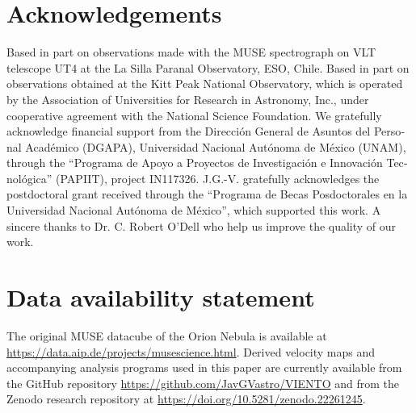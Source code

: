 \documentclass[fleqn,usenatbib, useAMS, a4paper]{mnras}
\begin{document}
\section*{Acknowledgements}
Based in part on observations made with the MUSE spectrograph
on VLT telescope UT4 at the La Silla Paranal Observatory, ESO, Chile.
Based in part on observations obtained at the Kitt Peak National Observatory,
which is operated by the Association of Universities for Research in Astronomy, Inc.,
under cooperative agreement with the National Science Foundation.
We gratefully acknowledge financial support from the \foreignlanguage{spanish}{Dirección General de Asuntos del Personal Académico (DGAPA), Universidad Nacional Autónoma de México (UNAM)}, through the ``\foreignlanguage{spanish}{Programa de Apoyo a Proyectos de Investigación e Innovación Tecnológica'' (PAPIIT), project IN117326}. J.G.-V. gratefully acknowledges the postdoctoral grant received through the ``\foreignlanguage{spanish}{Programa de Becas Posdoctorales en la Universidad Nacional Autónoma de México}'', which supported this work. A sincere thanks to Dr. C. Robert O'Dell who help us improve the quality of our work.


\section*{Data availability statement}
\label{sec:data-avail-stat}
The original MUSE datacube of the Orion Nebula is available at \url{https://data.aip.de/projects/musescience.html}.
Derived velocity maps and accompanying analysis programs used in this paper are currently available
from the GitHub repository \url{https://github.com/JavGVastro/VIENTO}
and from the Zenodo research repository at \url{https://doi.org/10.5281/zenodo.22261245}.



\end{document}
